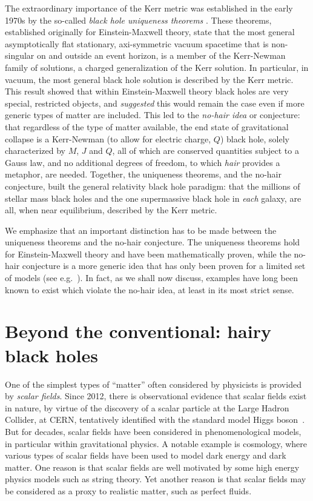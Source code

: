 The extraordinary importance of the Kerr metric was established in the early 1970s by the so-called \textit{black hole uniqueness theorems} \cite{Robinson:2004zz}.
These theorems, established originally for Einstein-Maxwell theory, state that the most general asymptotically flat stationary, axi-symmetric vacuum spacetime that is non-singular on and outside an event horizon, is a member of the Kerr-Newman family of solutions, a charged generalization of the Kerr solution.
In particular, in vacuum, the most general black hole solution is described by the Kerr metric.
This result showed that within Einstein-Maxwell theory black holes are very special, restricted objects, and \textit{suggested} this would remain the case even if more generic types of matter are included.
This led to the \textit{no-hair idea} or conjecture: that regardless of the type of matter available, the end state of gravitational collapse is a Kerr-Newman (to allow for electric charge, $Q$) black hole, solely characterized by $M$, $J$ and $Q$, all of which are conserved quantities subject to a Gauss law, and no additional degrees of freedom, to which \textit{hair} provides a metaphor, are needed.
Together, the uniqueness theorems, and the no-hair conjecture, built the general relativity black hole paradigm: that the millions of stellar mass black holes and the one supermassive black hole in \textit{each} galaxy, are all, when near equilibrium, described by the Kerr metric.  

We emphasize that an important distinction has to be made between the uniqueness theorems and the no-hair conjecture.
The uniqueness theorems hold for Einstein-Maxwell theory and have been mathematically proven, while the no-hair conjecture is a more generic idea that has only been proven for a limited set of models (see e.g.~\cite{Bekenstein:1996pn}).
In fact, as we shall now discuss, examples have long been known to exist which violate the no-hair idea, at least in its most strict sense.
\section{Beyond the conventional: hairy black holes}
\label{sec:bh_beyond_gr}

One of the simplest types of ``matter'' often considered by physicists is provided by \textit{scalar fields}.
Since 2012, there is observational evidence that scalar fields exist in nature, by virtue of the discovery of a scalar particle at the Large Hadron Collider, at CERN, tentatively identified with the standard model Higgs boson~\cite{Aad:2012tfa,Chatrchyan:2012ufa}.
But for decades, scalar fields have been considered in phenomenological models, in particular within gravitational physics.
A notable example is cosmology, where various types of scalar fields have been used to model dark energy and dark matter.
One reason is that scalar fields are well motivated by some high energy physics models such as string theory.
Yet another reason is that scalar fields may be considered as a proxy to realistic matter, such as perfect fluids.

